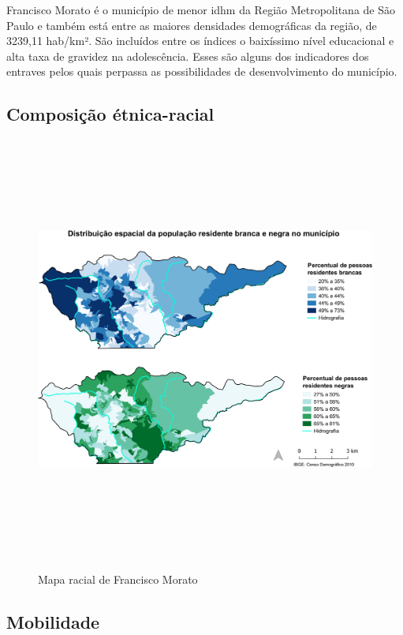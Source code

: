 	Francisco Morato é o município de menor \gls{idhm} da Região Metropolitana de São Paulo e também está entre as maiores densidades demográficas da região, de 3239,11 hab/km². São incluídos entre os índices o baixíssimo nível educacional e alta taxa de gravidez na adolescência. Esses são alguns dos indicadores dos entraves pelos quais perpassa as possibilidades de desenvolvimento do município.
	
	\subsection{Composição étnica-racial}

	\begin{landscape}
		\begin{figure}[h]
			\centering
			\caption{Mapa racial de Francisco Morato}
			\includegraphics[height=14cm,keepaspectratio]{img/ResidentesNegroseBrancos_BaixaRes.png}
			\label{mapa_racial}
		\end{figure}
	\end{landscape}
	
	\subsection{Mobilidade} \label{Mobilidade}
	
